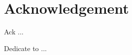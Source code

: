 \section*{Acknowledgement} 						%

\textmd{Ack ... }

\clearpage

\textmd{Dedicate to ... }
 \clearpage